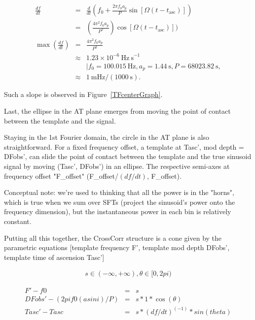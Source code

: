 \documentclass{article}
\begin{document}
\begin{eqnarray}
  \frac{df}{dt}
      &=& \frac{d}{dt} \left(f_0 + \frac{2 \pi f_0 a_p}{P} \sin \left[\Omega(t - t_\mathrm{asc})\right]\right)\\
      &=& \left(\frac{4 \pi^2 f_0 a_p}{P^2} \right) \cos[\Omega(t - t_\mathrm{asc})]) \\
  \max \left(\frac{df}{dt} \right)
      &=& \frac{4 \pi^2 f_0 a_p}{P^2}\\
      &\approx& 1.23 \times 10^{-6} \mathrm{~Hz~s}^{-1} \nonumber\\
      &~& \mid {f_0 = 100.015\mathrm{~Hz}, a_p = 1.44\mathrm{~s}, P = 68023.82\mathrm{~s} },\\
      &\approx& 1\mathrm{~mHz} / (1000\mathrm{~s}).
\end{eqnarray}

\noindent Such a slope is observed in Figure~\ref{TFcenterGraph}.

Last, the ellipse in the AT plane emerges from moving the point of contact between the template and the signal.


Staying in the 1st Fourier domain, the circle in the AT plane is also
straightforward. For a fixed frequency offset, a template at Tasc', mod
depth = DFobs', can slide the point of contact between the template and
the true sinusoid signal by moving (Tasc', DFobs') in an ellipse. The
respective semi-axes at frequency offset "F\_offset" (F\_offset/$(df/dt)$,
F\_offset).

Conceptual note: we're used to thinking that all the power is in the
"horns", which is true when we sum over SFTs (project the sinusoid's
power onto the frequency dimension), but the instantaneous power in each
bin is relatively constant.

Putting all this together, the CrossCorr structure is a cone given by
the parametric equations [template frequency F', template mod depth
DFobs', template time of ascension Tasc']

\begin{eqnarray}
s \in (-\infty, +\infty), \theta \in [0, 2 pi)
\end{eqnarray}

\begin{eqnarray}
F' - f0                        &=& s\\
DFobs' - (2 pi f0 (a sin i)/P) &=& s * 1 * \cos(\theta)\\
Tasc' - Tasc                   &=& s * (df/dt)^(-1) * sin(theta)
\end{eqnarray}
\end{document}
